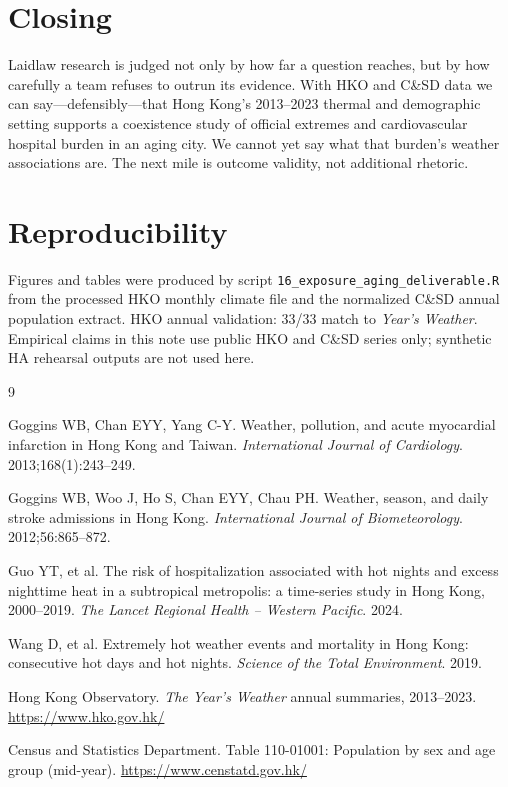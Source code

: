 \documentclass[11pt]{article}
\begin{document}
\section*{Closing}

Laidlaw research is judged not only by how far a question reaches, but by how carefully a
team refuses to outrun its evidence. With HKO and C\&SD data we can say---defensibly---that
Hong Kong's 2013--2023 thermal and demographic setting supports a coexistence study of
official extremes and cardiovascular hospital burden in an aging city. We cannot yet say
what that burden's weather associations are. The next mile is outcome validity, not
additional rhetoric.

\section*{Reproducibility}

Figures and tables were produced by script
\texttt{16\_exposure\_aging\_deliverable.R}
from the processed HKO monthly climate file and the normalized C\&SD annual
population extract. HKO annual validation: 33/33 match to \textit{Year's Weather}.
Empirical claims in this note use public HKO and C\&SD series only; synthetic HA
rehearsal outputs are not used here.
\begin{thebibliography}{9}

Goggins WB, Chan EYY, Yang C-Y.
Weather, pollution, and acute myocardial infarction in Hong Kong and Taiwan.
\textit{International Journal of Cardiology}. 2013;168(1):243--249.

Goggins WB, Woo J, Ho S, Chan EYY, Chau PH.
Weather, season, and daily stroke admissions in Hong Kong.
\textit{International Journal of Biometeorology}. 2012;56:865--872.

Guo YT, et al.
The risk of hospitalization associated with hot nights and excess nighttime heat in a
subtropical metropolis: a time-series study in Hong Kong, 2000--2019.
\textit{The Lancet Regional Health -- Western Pacific}. 2024.

Wang D, et al.
Extremely hot weather events and mortality in Hong Kong: consecutive hot days and hot
nights.
\textit{Science of the Total Environment}. 2019.

Hong Kong Observatory.
\textit{The Year's Weather} annual summaries, 2013--2023.
\url{https://www.hko.gov.hk/}

Census and Statistics Department.
Table 110-01001: Population by sex and age group (mid-year).
\url{https://www.censtatd.gov.hk/}

\end{thebibliography}
\end{document}
